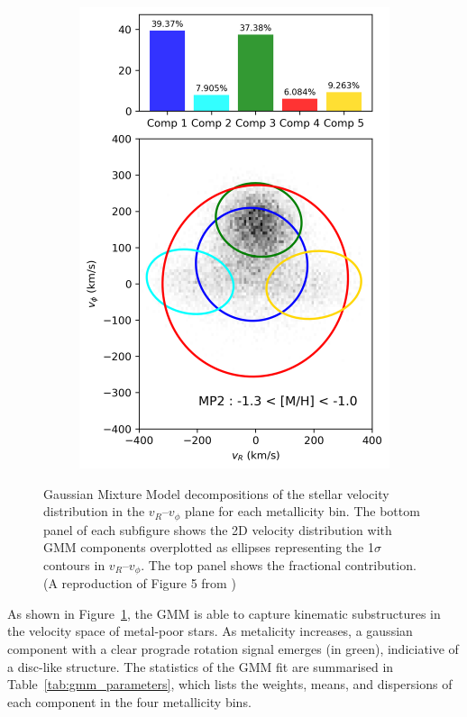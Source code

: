 \documentclass[a4paper,12pt]{article}
\begin{document}
\begin{figure}[h]
\begin{subfigure}[t]{0.24\textwidth}
        \includegraphics[width=\linewidth]{../figures/gmm_MP2.png}
    \end{subfigure}
    
    \caption{
        Gaussian Mixture Model decompositions of the stellar velocity distribution in the $v_R$–$v_\phi$ plane for each metallicity bin. 
        The bottom panel of each subfigure shows the 2D velocity distribution with GMM components overplotted as ellipses representing the 1$\sigma$ contours in $v_R$–$v_\phi$.
        The top panel shows the fractional contribution. (A reproduction of Figure 5 from \citet{zhang2024existencemetalpoordiscmilky})
    }
    \label{fig:gmm_decompositions}
\end{figure}

As shown in Figure~\ref{fig:gmm_decompositions}, the GMM is able to capture kinematic substructures in the velocity space 
of metal-poor stars. As metalicity increases, a gaussian component with a clear prograde rotation signal emerges (in green),
indiciative of a disc-like structure. The statistics of the GMM fit are summarised in Table~\ref{tab:gmm_parameters},
which lists the weights, means, and dispersions of each component in the four metallicity bins.
\end{document}
